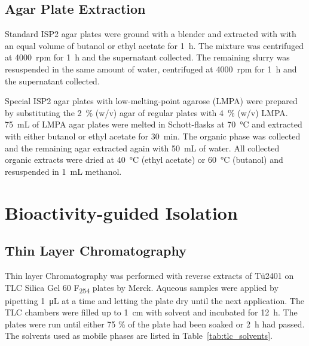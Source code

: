 	\subsection{Agar Plate Extraction} %
	\label{sub:agar_plate_extraction}

	Standard ISP2 agar plates were ground with a blender and extracted with with an equal volume of butanol or ethyl acetate for \SI{1}{\hour}. The mixture was centrifuged at 4000~rpm for \SI{1}{\hour} and the supernatant collected. The remaining slurry was resuspended in the same amount of water, centrifuged at 4000~rpm for \SI{1}{\hour} and the supernatant collected.

	Special ISP2 agar plates with low-melting-point agarose (LMPA) were prepared by substituting the 2~\% (w/v) agar of regular plates with 4~\% (w/v) LMPA. \SI{75}{\milli\liter} of LMPA agar plates were melted in Schott-flasks at \SI{70}{\celsius} and extracted with either butanol or ethyl acetate for \SI{30}{\minute}. The organic phase was collected and the remaining agar extracted again with \SI{50}{\milli\liter} of water. All collected organic extracts were dried at \SI{40}{\celsius} (ethyl acetate) or \SI{60}{\celsius} (butanol) and resuspended in \SI{1}{\milli\liter} methanol.



\section{Bioactivity-guided Isolation} %
\label{sec:bioactivity_guided_isolation}

	\subsection{Thin Layer Chromatography} %
	\label{sub:thin_layer_chromatography}
	Thin layer Chromatography was performed with reverse extracts of T\"u2401 on TLC Silica Gel 60 F\textsubscript{254} plates by Merck.
	Aqueous samples were applied by pipetting \SI{1}{\micro\liter} at a time and letting the plate dry until the next application. The TLC chambers were filled up to \SI{1}{\centi\meter} with solvent and incubated for \SI{12}{\hour}. The plates were run until either 75 \% of the plate had been soaked or \SI{2}{\hour} had passed. The solvents used as mobile phases are listed in Table~\ref{tab:tlc_solvents}.

